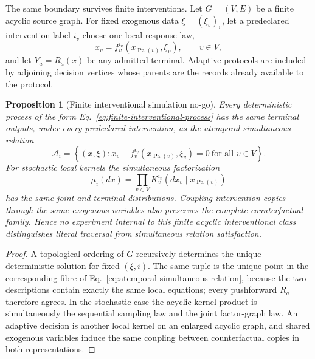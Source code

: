 \documentclass[11pt]{article}
\newtheorem{proposition}{Proposition}
\begin{document}
The same boundary survives finite interventions.  Let $G=(V,E)$ be a finite
acyclic source graph.  For fixed exogenous data $\xi=(\xi_v)_v$, let a
predeclared intervention label $i_v$ choose one local response law,
\begin{equation}
 x_v=f_v^{i_v}\!\left(x_{\operatorname{Pa}(v)},\xi_v\right),
 \qquad v\in V,
 \label{eq:finite-interventional-process}
\end{equation}
and let $Y_a=R_a(x)$ be any admitted terminal.  Adaptive protocols are
included by adjoining decision vertices whose parents are the records already
available to the protocol.

\begin{proposition}[Finite interventional simulation no-go]
\label{prop:finite-interventional-simulation}
Every deterministic process of the form
Eq.~\eqref{eq:finite-interventional-process} has the same terminal outputs,
under every predeclared intervention, as the atemporal simultaneous relation
\begin{equation}
 \mathcal A_i=
 \left\{(x,\xi):
 x_v-f_v^{i_v}\!\left(x_{\operatorname{Pa}(v)},\xi_v\right)=0
 \ \text{for all }v\in V\right\}.
 \label{eq:atemporal-simultaneous-relation}
\end{equation}
For stochastic local kernels the simultaneous factorization
\begin{equation}
 \mu_i(dx)=\prod_{v\in V}
 K_v^{i_v}\!\left(dx_v\mid x_{\operatorname{Pa}(v)}\right)
 \label{eq:atemporal-kernel-factorization}
\end{equation}
has the same joint and terminal distributions.  Coupling intervention copies
through the same exogenous variables also preserves the complete
counterfactual family.  Hence no experiment internal to this finite acyclic
interventional class distinguishes literal traversal from simultaneous
relation satisfaction.
\end{proposition}

\begin{proof}
A topological ordering of $G$ recursively determines the unique deterministic
solution for fixed $(\xi,i)$.  The same tuple is the unique point in the
corresponding fibre of Eq.~\eqref{eq:atemporal-simultaneous-relation}, because
the two descriptions contain exactly the same local equations; every
pushforward $R_a$ therefore agrees.  In the stochastic case the acyclic kernel
product is simultaneously the sequential sampling law and the joint
factor-graph law.  An adaptive decision is another local kernel on an enlarged
acyclic graph, and shared exogenous variables induce the same coupling between
counterfactual copies in both representations.
\end{proof}
\end{document}

